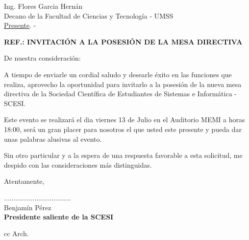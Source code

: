 \documentclass[letterpaper,12pt]{letter}
\begin{document}
\date {12 de julio de 2012}
\begin{letter}{ Ing. Flores Garcia Hernán \\ Decano de la Facultad de Ciencias y Tecnolog\'ia - UMSS \\ \underline {Presente}. -}

\begin{center}
	\opening{\textbf{REF.: INVITACI\'ON A LA POSESI\'ON DE LA MESA DIRECTIVA}}
\end{center}

De nuestra consideración:

A tiempo de enviarle un cordial saludo y desearle éxito en las funciones que realiza, aprovecho 
la oportunidad para invitarlo a la posesi\'on de la nueva mesa directiva de la Sociedad Cient\'ifica 
de Estudiantes de Sistemas e Inform\'atica - SCESI.

Este evento se realizar\'a el dia viernes 13 de Julio en el Auditorio MEMI a horas 18:00, ser\'a 
un gran placer para nosotros el que usted este presente y pueda dar unas palabras alusivas al evento.

Sin otro particular y a la espera de una respuesta favorable a esta solicitud, me despido con las 
consideraciones más distinguidas.

Atentamente,

\vspace{2.5cm}

\begin{center}
...................................\\
Benjam\'in P\'erez\\
{\bfseries Presidente saliente de la SCESI}
\end{center}
\vspace{1.5cm}
cc Arch.
\end{letter}
\end{document}
